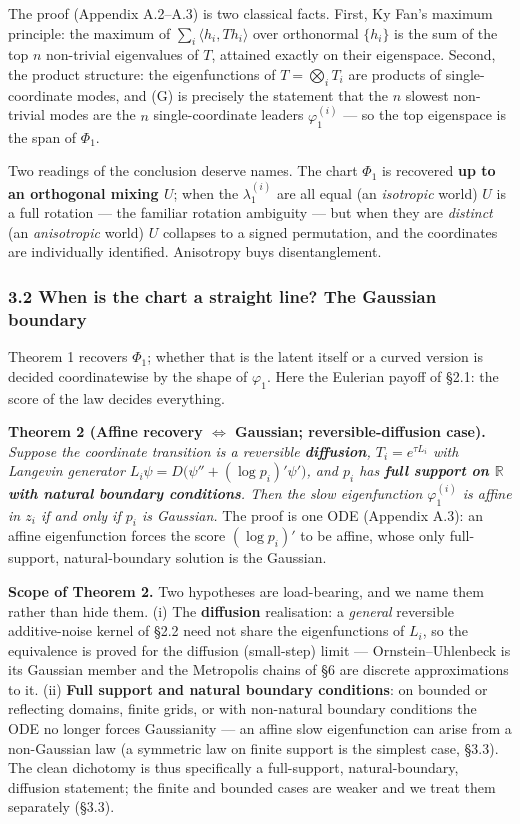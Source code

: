 \documentclass[
  letterpaper,
  11pt]{article}
\theoremstyle{plain}
\theoremstyle{definition}
\theoremstyle{remark}
\begin{document}
The proof (Appendix A.2--A.3) is two classical facts. First, Ky Fan's maximum principle: the maximum of \(\sum_{i}\langle h_i,Th_i\rangle\) over orthonormal \(\{h_i\}\) is the sum of the top \(n\) non-trivial eigenvalues of \(T\), attained exactly on their eigenspace. Second, the product structure: the eigenfunctions of \(T=\bigotimes_iT_i\) are products of single-coordinate modes, and (G) is precisely the statement that the \(n\) slowest non-trivial modes are the \(n\) single-coordinate leaders \(\varphi_1^{(i)}\) --- so the top eigenspace is the span of \(\Phi_1\).

Two readings of the conclusion deserve names. The chart \(\Phi_1\) is recovered \textbf{up to an orthogonal mixing \(U\)}; when the \(\lambda_1^{(i)}\) are all equal (an \emph{isotropic} world) \(U\) is a full rotation --- the familiar rotation ambiguity --- but when they are \emph{distinct} (an \emph{anisotropic} world) \(U\) collapses to a signed permutation, and the coordinates are individually identified. Anisotropy buys disentanglement.

\subsubsection{3.2 When is the chart a straight line? The Gaussian boundary}\label{when-is-the-chart-a-straight-line-the-gaussian-boundary}

Theorem 1 recovers \(\Phi_1\); whether that is the latent itself or a curved version is decided coordinatewise by the shape of \(\varphi_1\). Here the Eulerian payoff of §2.1: the score of the law decides everything.

\textbf{Theorem 2 (Affine recovery \(\iff\) Gaussian; reversible-diffusion case).} \emph{Suppose the coordinate transition is a reversible \textbf{diffusion}, \(T_i = e^{\tau L_i}\) with Langevin generator \(L_i\psi = D\big(\psi'' + (\log p_i)'\psi'\big)\), and \(p_i\) has \textbf{full support on \(\mathbb R\) with natural boundary conditions}. Then the slow eigenfunction \(\varphi_1^{(i)}\) is affine in \(z_i\) if and only if \(p_i\) is Gaussian.} The proof is one ODE (Appendix A.3): an affine eigenfunction forces the score \((\log p_i)'\) to be affine, whose only full-support, natural-boundary solution is the Gaussian.

\textbf{Scope of Theorem 2.} Two hypotheses are load-bearing, and we name them rather than hide them. (i) The \textbf{diffusion} realisation: a \emph{general} reversible additive-noise kernel of §2.2 need not share the eigenfunctions of \(L_i\), so the equivalence is proved for the diffusion (small-step) limit --- Ornstein--Uhlenbeck is its Gaussian member and the Metropolis chains of §6 are discrete approximations to it. (ii) \textbf{Full support and natural boundary conditions}: on bounded or reflecting domains, finite grids, or with non-natural boundary conditions the ODE no longer forces Gaussianity --- an affine slow eigenfunction can arise from a non-Gaussian law (a symmetric law on finite support is the simplest case, §3.3). The clean dichotomy is thus specifically a full-support, natural-boundary, diffusion statement; the finite and bounded cases are weaker and we treat them separately (§3.3).
\end{document}

